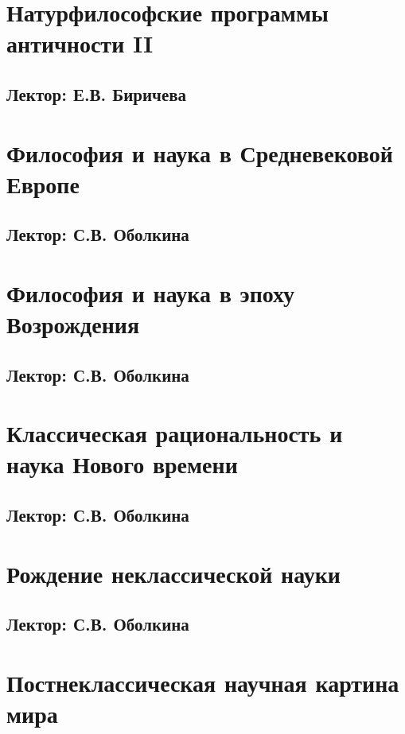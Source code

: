 \documentclass[a4paper, 12pt, notitlepage]{report}
\begin{document}
\chapter{Натурфилософские программы античности II}
\section*{Лектор: Е.В. Биричева} 



\chapter{Философия и наука в Средневековой Европе}
\section*{Лектор: С.В. Оболкина} 



\chapter{Философия и наука в эпоху Возрождения}
\section*{Лектор: С.В. Оболкина} 



\chapter{Классическая рациональность и наука Нового времени}
\section*{Лектор: С.В. Оболкина} 



\chapter{Рождение неклассической науки}
\section*{Лектор: С.В. Оболкина} 



\chapter{Постнеклассическая научная картина мира}
\end{document}
